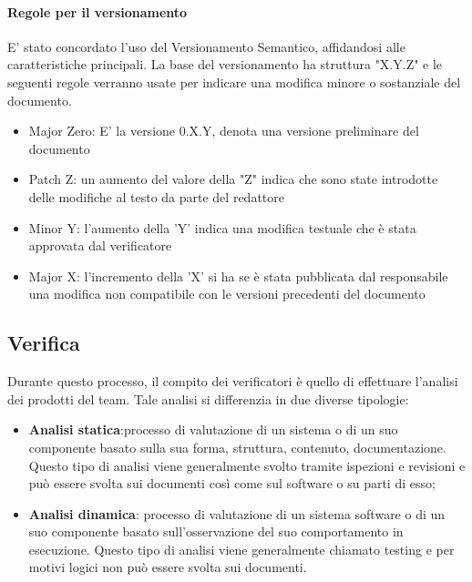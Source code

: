 \documentclass[12pt]{article}
\begin{document}
\paragraph{Regole per il versionamento}
\label{ver}
E' stato concordato l'uso del Versionamento Semantico, affidandosi alle caratteristiche principali.
La base del versionamento ha struttura "X.Y.Z" e le seguenti regole verranno usate per indicare una modifica minore o sostanziale del documento.
\begin{itemize}
    \item Major Zero: E' la versione 0.X.Y, denota una versione preliminare del documento
    \item Patch Z: un aumento del valore della "Z" indica che sono state introdotte delle modifiche al testo da parte del redattore
    \item Minor Y: l'aumento della 'Y' indica una modifica testuale che è stata approvata dal verificatore
    \item Major X: l'incremento della 'X' si ha se è stata pubblicata dal responsabile una modifica non compatibile con le versioni precedenti del documento
\end{itemize}


\subsection{Verifica}
Durante questo processo, il compito dei verificatori è quello di effettuare l’analisi dei prodotti del team.
Tale analisi si differenzia in due diverse tipologie:
\begin{itemize}
    \item \textbf{Analisi statica}:processo di valutazione di un sistema o di un suo componente basato sulla sua
          forma, struttura, contenuto, documentazione. Questo tipo di analisi viene generalmente svolto
          tramite ispezioni e revisioni e può essere svolta sui documenti così come sul software o su parti
          di esso;

    \item \textbf{Analisi dinamica}: processo di valutazione di un sistema software o di un suo componente
          basato sull’osservazione del suo comportamento in esecuzione. Questo tipo di analisi viene
          generalmente chiamato testing e per motivi logici non può essere svolta sui documenti.
\end{itemize}
\end{document}
